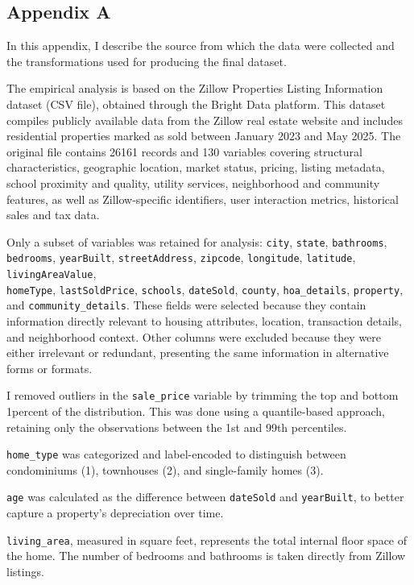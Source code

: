 \subsection*{Appendix A}

In this appendix, I describe the source from which the data were collected and the transformations used for producing the final dataset.

The empirical analysis is based on the Zillow Properties Listing Information dataset (CSV file), obtained through the Bright Data platform. This dataset compiles publicly available data from the Zillow real estate website and includes residential properties marked as sold between January 2023 and May 2025. The original file contains 26161 records and 130 variables covering structural characteristics, geographic location, market status, pricing, listing metadata, school proximity and quality, utility services, neighborhood and community features, as well as Zillow-specific identifiers, user interaction metrics,  historical sales and tax data. 

Only a subset of variables was retained for analysis:
\texttt{city}, \texttt{state}, \texttt{bathrooms}, \texttt{bedrooms}, \texttt{yearBuilt}, \texttt{streetAddress}, \texttt{zipcode}, \texttt{longitude}, \texttt{latitude}, \texttt{livingAreaValue}, \\
\texttt{homeType}, \texttt{lastSoldPrice}, \texttt{schools}, \texttt{dateSold}, \texttt{county}, \texttt{hoa\_details}, \texttt{property}, and \texttt{community\_details}. These fields were selected because they contain information directly relevant to housing attributes, location, transaction details, and neighborhood context. Other columns were excluded because they were either irrelevant or redundant, presenting the same information in alternative forms or formats. 

I removed outliers in the \texttt{sale\_price} variable by trimming the top and bottom 1percent  of the distribution. This was done using a quantile-based approach, retaining only the observations between the 1st and 99th percentiles.

\texttt{home\_type} was categorized and label-encoded to distinguish between condominiums (1), townhouses (2), and single-family homes (3). 

\texttt{age} was calculated as the difference between \texttt{dateSold} and \texttt{yearBuilt}, to better capture a property's depreciation over time. 

\texttt{living\_area}, measured in square feet, represents the total internal floor space of the home. The number of bedrooms and bathrooms is taken directly from Zillow listings. 

